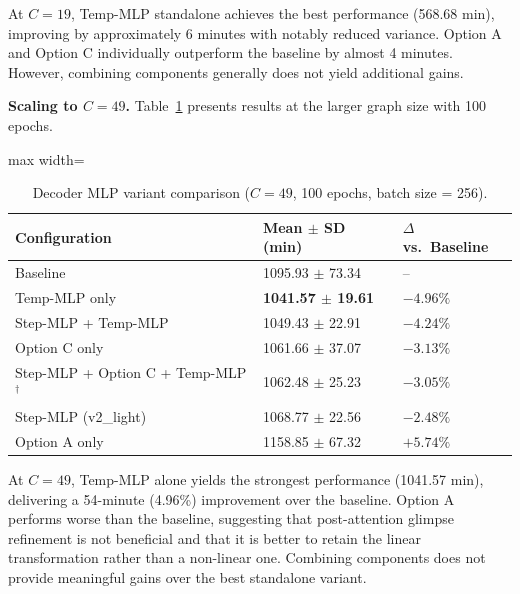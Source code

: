 At $C = 19$, Temp-MLP standalone achieves the best performance (568.68 min), improving by
approximately 6 minutes with notably reduced variance. Option A and Option C individually
outperform the baseline by almost 4 minutes. However, combining components generally does
not yield additional gains.

\textbf{Scaling to $C = 49$.} Table~\ref{tab:decoder_mlp_c49} presents results at the
larger graph size with 100 epochs.

\begin{table}[H]
\centering
\caption{Decoder MLP variant comparison ($C = 49$, 100 epochs, batch size = 256).}
\label{tab:decoder_mlp_c49}
\begin{adjustbox}{max width=\textwidth}
\begin{tabular}{lll}
\toprule
\textbf{Configuration} & \textbf{Mean $\pm$ SD (min)} & \textbf{$\Delta$ vs.\ Baseline} \\
\midrule
Baseline                                 & 1095.93 $\pm$ 73.34 & -- \\
Temp-MLP only                            & \textbf{1041.57 $\pm$ 19.61} & $-4.96\%$ \\
Step-MLP + Temp-MLP                      & 1049.43 $\pm$ 22.91 & $-4.24\%$ \\
Option C only                            & 1061.66 $\pm$ 37.07 & $-3.13\%$ \\
Step-MLP + Option C + Temp-MLP$^\dagger$ & 1062.48 $\pm$ 25.23 & $-3.05\%$ \\
Step-MLP (v2\_light)                     & 1068.77 $\pm$ 22.56 & $-2.48\%$ \\
Option A only                            & 1158.85 $\pm$ 67.32 & $+5.74\%$ \\
\bottomrule
\end{tabular}
\end{adjustbox}
\end{table}


\medskip

At $C = 49$, Temp-MLP alone yields the strongest performance (1041.57 min), delivering a
54-minute (4.96\%) improvement over the baseline. Option A performs worse than the baseline,
suggesting that post-attention glimpse refinement is not beneficial and that it is better to
retain the linear transformation rather than a non-linear one. Combining components does not
provide meaningful gains over the best standalone variant.

